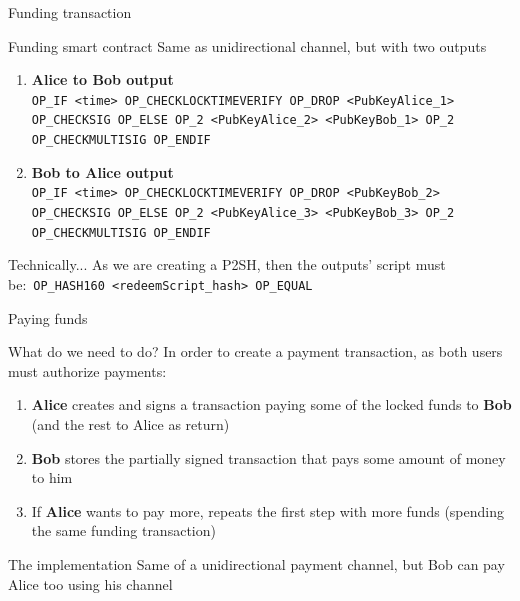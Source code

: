 \documentclass{beamer}
\begin{document}
\begin{frame}{Funding transaction}
 \begin{exampleblock}{Funding smart contract}
  Same as unidirectional channel, but with two outputs
  \pause
  \begin{center}
   \begin{enumerate}[<+->]
    \item \textbf{Alice to Bob output}\\
          \small{\texttt{OP\_IF <time> OP\_CHECKLOCKTIMEVERIFY OP\_DROP <PubKeyAlice\_1> OP\_CHECKSIG OP\_ELSE OP\_2 <PubKeyAlice\_2> <PubKeyBob\_1> OP\_2 OP\_CHECKMULTISIG OP\_ENDIF}}
    \item \textbf{Bob to Alice output}\\
          \small{\texttt{OP\_IF <time> OP\_CHECKLOCKTIMEVERIFY OP\_DROP <PubKeyBob\_2> OP\_CHECKSIG OP\_ELSE OP\_2 <PubKeyAlice\_3> <PubKeyBob\_3> OP\_2 OP\_CHECKMULTISIG OP\_ENDIF}}
   \end{enumerate}
  \end{center}
 \end{exampleblock}
 \pause
 \begin{exampleblock}{Technically...}
  As we are creating a P2SH, then the outputs' script must be:\
  \texttt{OP\_HASH160 <redeemScript\_hash> OP\_EQUAL}
 \end{exampleblock}
\end{frame}
\begin{frame}{Paying funds}
 \begin{block}{What do we need to do?}
  In order to create a payment transaction, as both users must authorize payments:
  \begin{enumerate}
   \item \textbf{Alice} creates and signs a transaction paying some of the locked funds to \textbf{Bob} (and the rest to Alice as return)
   \item \textbf{Bob} stores the partially signed transaction that pays some amount of money to him
   \item If \textbf{Alice} wants to pay more, repeats the first step with more funds (spending the same funding transaction)
  \end{enumerate}
 \end{block}
 \pause
 \begin{block}{The implementation}
  Same of a unidirectional payment channel, but Bob can pay Alice too using his channel
 \end{block}
\end{frame}
\end{document}
